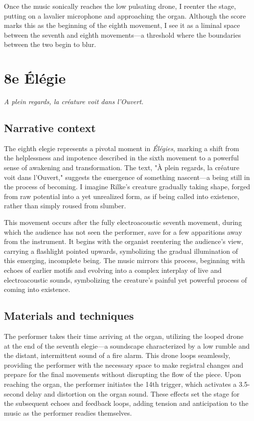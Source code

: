 \documentclass[12pt,twoside,maitrise]{dms_ks}
\theoremstyle{definition}
\begin{document}
Once the music sonically reaches the low pulsating drone, I reenter the stage, putting on a lavalier microphone and approaching the organ. 
Although the score marks this as the beginning of the eighth movement, I see it as a liminal space between the seventh and eighth movements—a threshold where the boundaries between the two begin to blur.

\section{8e Élégie}

\epigraph{\textit{A plein regards, la créature voit dans l’Ouvert.}}{}

\subsection{Narrative context}

The eighth elegie represents a pivotal moment in \textit{Élégies}, marking a shift from the helplessness and impotence described in the sixth movement to a powerful sense of awakening and transformation. 
The text, "À plein regards, la créature voit dans l’Ouvert," suggests the emergence of something nascent—a being still in the process of becoming. 
I imagine Rilke's creature gradually taking shape, forged from raw potential into a yet unrealized form, as if being called into existence, rather than simply roused from slumber.

This movement occurs after the fully electroacoustic seventh movement, during which the audience has not seen the performer, save for a few apparitions away from the instrument. 
It begins with the organist reentering the audience's view, carrying a flashlight pointed upwards, symbolizing the gradual illumination of this emerging, incomplete being. 
The music mirrors this process, beginning with echoes of earlier motifs and evolving into a complex interplay of live and electroacoustic sounds, symbolizing the creature’s painful yet powerful process of coming into existence.

\subsection{Materials and techniques}

The performer takes their time arriving at the organ, utilizing the looped drone at the end of the seventh elegie—a soundscape characterized by a low rumble and the distant, intermittent sound of a fire alarm. 
This drone loops seamlessly, providing the performer with the necessary space to make registral changes and prepare for the final movements without disrupting the flow of the piece. 
Upon reaching the organ, the performer initiates the 14th trigger, which activates a 3.5-second delay and distortion on the organ sound. 
These effects set the stage for the subsequent echoes and feedback loops, adding tension and anticipation to the music as the performer readies themselves.
\end{document}
